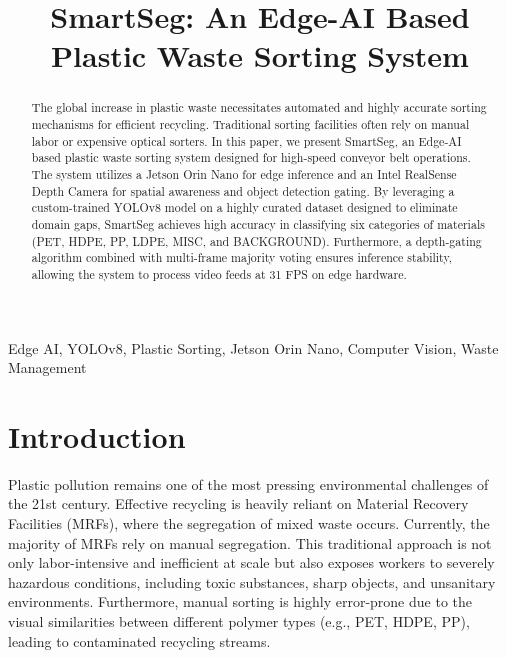 \documentclass[conference,onecolumn]{IEEEtran}
\begin{document}
\title{SmartSeg: An Edge-AI Based Plastic Waste Sorting System\\
}

\author{
}

\maketitle

\begin{abstract}
The global increase in plastic waste necessitates automated and highly accurate sorting mechanisms for efficient recycling. Traditional sorting facilities often rely on manual labor or expensive optical sorters. In this paper, we present SmartSeg, an Edge-AI based plastic waste sorting system designed for high-speed conveyor belt operations. The system utilizes a Jetson Orin Nano for edge inference and an Intel RealSense Depth Camera for spatial awareness and object detection gating. By leveraging a custom-trained YOLOv8 model on a highly curated dataset designed to eliminate domain gaps, SmartSeg achieves high accuracy in classifying six categories of materials (PET, HDPE, PP, LDPE, MISC, and BACKGROUND). Furthermore, a depth-gating algorithm combined with multi-frame majority voting ensures inference stability, allowing the system to process video feeds at 31 FPS on edge hardware.
\end{abstract}

\begin{IEEEkeywords}
Edge AI, YOLOv8, Plastic Sorting, Jetson Orin Nano, Computer Vision, Waste Management
\end{IEEEkeywords}

\section{Introduction}
Plastic pollution remains one of the most pressing environmental challenges of the 21st century. Effective recycling is heavily reliant on Material Recovery Facilities (MRFs), where the segregation of mixed waste occurs. Currently, the majority of MRFs rely on manual segregation. This traditional approach is not only labor-intensive and inefficient at scale but also exposes workers to severely hazardous conditions, including toxic substances, sharp objects, and unsanitary environments. Furthermore, manual sorting is highly error-prone due to the visual similarities between different polymer types (e.g., PET, HDPE, PP), leading to contaminated recycling streams. 
\end{document}
